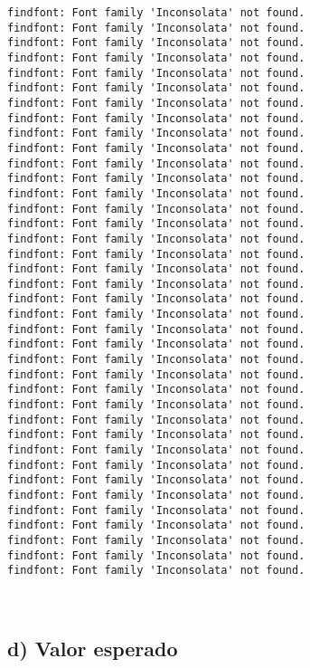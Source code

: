 \documentclass[11pt]{article}
\begin{document}
    \begin{Verbatim}[commandchars=\\\{\}]
findfont: Font family 'Inconsolata' not found.
findfont: Font family 'Inconsolata' not found.
findfont: Font family 'Inconsolata' not found.
findfont: Font family 'Inconsolata' not found.
findfont: Font family 'Inconsolata' not found.
findfont: Font family 'Inconsolata' not found.
findfont: Font family 'Inconsolata' not found.
findfont: Font family 'Inconsolata' not found.
findfont: Font family 'Inconsolata' not found.
findfont: Font family 'Inconsolata' not found.
findfont: Font family 'Inconsolata' not found.
findfont: Font family 'Inconsolata' not found.
findfont: Font family 'Inconsolata' not found.
findfont: Font family 'Inconsolata' not found.
findfont: Font family 'Inconsolata' not found.
findfont: Font family 'Inconsolata' not found.
findfont: Font family 'Inconsolata' not found.
findfont: Font family 'Inconsolata' not found.
findfont: Font family 'Inconsolata' not found.
findfont: Font family 'Inconsolata' not found.
findfont: Font family 'Inconsolata' not found.
findfont: Font family 'Inconsolata' not found.
findfont: Font family 'Inconsolata' not found.
findfont: Font family 'Inconsolata' not found.
findfont: Font family 'Inconsolata' not found.
findfont: Font family 'Inconsolata' not found.
findfont: Font family 'Inconsolata' not found.
findfont: Font family 'Inconsolata' not found.
findfont: Font family 'Inconsolata' not found.
findfont: Font family 'Inconsolata' not found.
findfont: Font family 'Inconsolata' not found.
findfont: Font family 'Inconsolata' not found.
findfont: Font family 'Inconsolata' not found.
findfont: Font family 'Inconsolata' not found.
findfont: Font family 'Inconsolata' not found.
findfont: Font family 'Inconsolata' not found.
findfont: Font family 'Inconsolata' not found.
findfont: Font family 'Inconsolata' not found.
    \end{Verbatim}

    \begin{center}
    \end{center}
    { \hspace*{\fill} \\}
    
    \hypertarget{d-valor-esperado}{%
\subsection{d) Valor esperado}\label{d-valor-esperado}}
\end{document}
